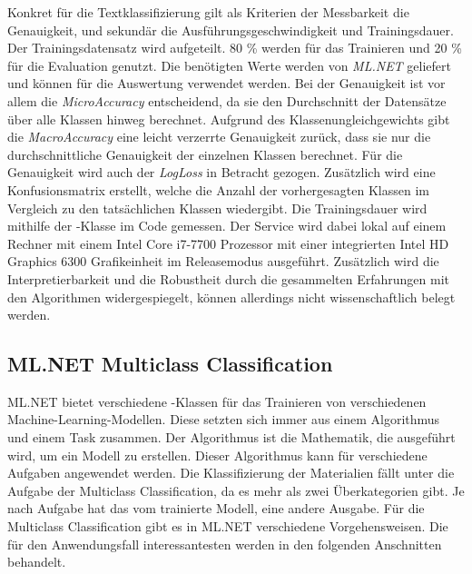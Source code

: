 Konkret für die Textklassifizierung gilt als Kriterien der Messbarkeit die Genauigkeit, und sekundär die Ausführungsgeschwindigkeit und Trainingsdauer. Der Trainingsdatensatz wird aufgeteilt. 80 \% werden für das Trainieren und 20 \% für die Evaluation genutzt. Die benötigten Werte werden von \textit{ML.NET} geliefert und können für die Auswertung verwendet werden. Bei der Genauigkeit ist vor allem die \textit{MicroAccuracy} entscheidend, da sie den Durchschnitt der Datensätze über alle Klassen hinweg berechnet. Aufgrund des Klassenungleichgewichts gibt die \textit{MacroAccuracy} eine leicht verzerrte Genauigkeit zurück, dass sie nur die durchschnittliche Genauigkeit der einzelnen Klassen berechnet. Für die Genauigkeit wird auch der \textit{LogLoss} in Betracht gezogen. Zusätzlich wird eine Konfusionsmatrix erstellt, welche die Anzahl der vorhergesagten Klassen im Vergleich zu den tatsächlichen Klassen wiedergibt. \citep[vgl.][]{metrics_doc}
Die Trainingsdauer wird mithilfe der -Klasse im Code gemessen. Der Service wird dabei lokal auf einem Rechner mit einem Intel Core i7-7700 Prozessor mit einer integrierten Intel HD Graphics 6300 Grafikeinheit im Releasemodus ausgeführt.
Zusätzlich wird die Interpretierbarkeit und die Robustheit durch die gesammelten Erfahrungen mit den Algorithmen widergespiegelt, können allerdings nicht wissenschaftlich belegt werden.

\subsection{ML.NET Multiclass Classification}
\label{c:conception:classification:multiclass}
ML.NET bietet verschiedene -Klassen für das Trainieren von verschiedenen Machine-Learning-Modellen. Diese setzten sich immer aus einem Algorithmus und einem \glqq Task\grqq{} zusammen. Der Algorithmus ist die Mathematik, die ausgeführt wird, um ein Modell zu erstellen. Dieser Algorithmus kann für verschiedene Aufgaben angewendet werden. Die Klassifizierung der Materialien fällt unter die Aufgabe der Multiclass Classification, da es mehr als zwei Überkategorien gibt. Je nach Aufgabe hat das vom  trainierte Modell, eine andere Ausgabe. \citep[vgl.][]{select_ml_2021}
Für die Multiclass Classification gibt es in ML.NET verschiedene Vorgehensweisen. Die für den Anwendungsfall interessantesten werden in den folgenden Anschnitten behandelt.

